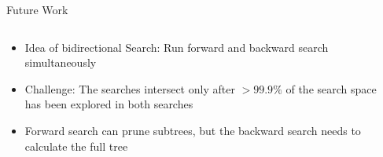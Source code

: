 \begin{frame}{Future Work}
  \vspace{-1.2cm}
  \begin{columns}
    \begin{column}{.49\textwidth}
      \begin{itemize}
        \item<+-> Idea of bidirectional Search: Run forward and backward search simultaneously
        \item<+-> Challenge: The searches intersect only after $> 99.9\%$ of the search space has been explored in both searches
        \item<+-> Forward search can prune subtrees, but the backward search needs to calculate the full tree
      \end{itemize}
    \end{column}
    \begin{column}{.49\textwidth}
    \end{column}
  \end{columns}
\end{frame}


\thanksframe
